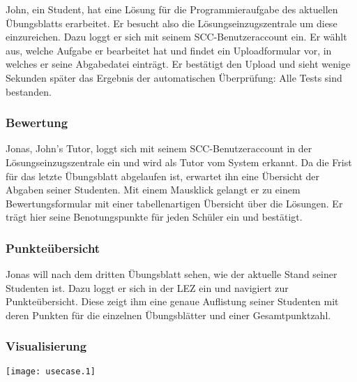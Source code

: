 \documentclass[a4paper,10pt]{article}
\begin{document}
John, ein Student, hat eine Lösung für die Programmieraufgabe des aktuellen Übungsblatts erarbeitet. Er besucht also die Lösungseinzugszentrale um diese einzureichen. Dazu loggt er sich mit seinem SCC-Benutzeraccount ein. Er wählt aus, welche Aufgabe er bearbeitet hat und findet ein Uploadformular vor, in welches er seine Abgabedatei einträgt. Er bestätigt den Upload und sieht wenige Sekunden später das Ergebnis der automatischen Überprüfung: Alle Tests sind bestanden.

\subsubsection{Bewertung}

Jonas, John's Tutor, loggt sich mit seinem SCC-Benutzeraccount in der Lösungseinzugszentrale ein und wird als Tutor vom System erkannt.  Da die Frist für das letzte Übungsblatt abgelaufen ist, erwartet ihn eine Übersicht der Abgaben seiner Studenten. Mit einem Mausklick gelangt er zu einem Bewertungsformular mit einer tabellenartigen Übersicht über die Lösungen.  Er trägt hier seine Benotungspunkte für jeden Schüler ein und bestätigt.

\subsubsection{Punkteübersicht}

Jonas will nach dem dritten Übungsblatt sehen, wie der aktuelle Stand seiner Studenten ist.  Dazu loggt er sich in der LEZ ein und navigiert zur Punkteübersicht. Diese zeigt ihm eine genaue Auflistung seiner Studenten mit deren Punkten für die einzelnen Übungsblätter und einer Gesamtpunktzahl.

\subsubsection{Visualisierung}

\texttt{[image: usecase.1]}

\clearpage

\end{document}

